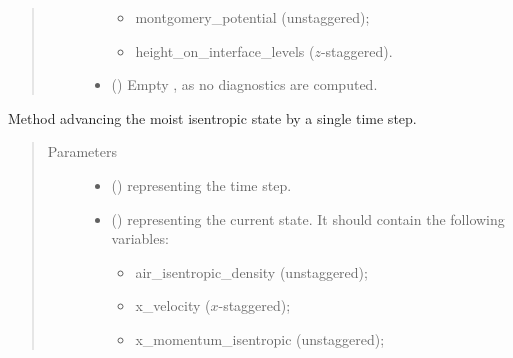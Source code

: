 \documentclass[letterpaper,10pt,english]{sphinxmanual}
\begin{document}
\begin{fulllineitems}
\begin{fulllineitems}
\begin{quote}
\begin{description}
\begin{itemize}
\begin{itemize}
\item {} 
montgomery\_potential (unstaggered);

\item {} 
height\_on\_interface\_levels (\(z\)-staggered).

\end{itemize}

\item {} 
 () \textendash{} Empty , as no diagnostics are computed.

\end{itemize}


\end{description}\end{quote}

\end{fulllineitems}


\begin{fulllineitems}
\label{\detokenize{api:dycore.dycore_isentropic.DynamicalCoreIsentropic._step_moist}}
Method advancing the moist isentropic state by a single time step.
\begin{quote}\begin{description}
\item[{Parameters}] \leavevmode\begin{itemize}
\item {} 
 () \textendash{}  representing the time step.

\item {} 
 () \textendash{} 
{\hyperref[\detokenize{api:storages.state_isentropic.StateIsentropic}]{}} representing the current state.
It should contain the following variables:
\begin{itemize}
\item {} 
air\_isentropic\_density (unstaggered);

\item {} 
x\_velocity (\(x\)-staggered);

\item {} 
x\_momentum\_isentropic (unstaggered);


\end{itemize}
\end{itemize}
\end{description}
\end{quote}
\end{fulllineitems}
\end{fulllineitems}
\end{document}
